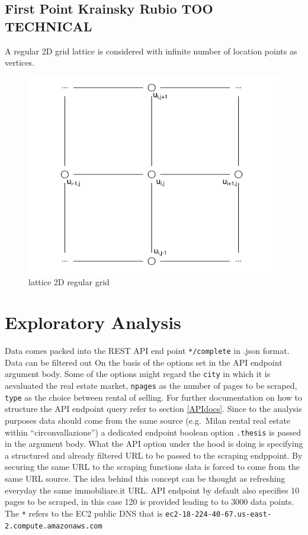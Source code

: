 \documentclass[
  12pt,
  a4paper,
  oneside]{book}
\theoremstyle{definition}
\theoremstyle{definition}
\theoremstyle{definition}
\theoremstyle{remark}
\begin{document}
\hypertarget{first-point-krainsky-rubio-too-technical}{%
\section{First Point Krainsky Rubio TOO TECHNICAL}\label{first-point-krainsky-rubio-too-technical}}

A regular 2D grid lattice is considered with infinite number of location points as vertices.

\begin{figure}
\centering
\includegraphics{images/lattice.png}
\caption{lattice 2D regular grid}
\end{figure}

\hypertarget{exploratory}{%
\chapter{Exploratory Analysis}\label{exploratory}}

Data comes packed into the REST API end point \texttt{*/complete} in .json format. Data can be filtered out On the basis of the options set in the API endpoint argument body. Some of the options might regard the \texttt{city} in which it is aevaluated the real estate market, \texttt{npages} as the number of pages to be scraped, \texttt{type} as the choice between rental of selling. For further documentation on how to structure the API endpoint query refer to section \ref{APIdocs}. Since to the analysis purposes data should come from the same source (e.g.~Milan rental real estate within ``circonvallazione'') a dedicated endpoint boolean option \texttt{.thesis} is passed in the argument body. What the API option under the hood is doing is specifying a structured and already filtered URL to be passed to the scraping endppoint. By securing the same URL to the scraping functions data is forced to come from the same URL source. The idea behind this concept can be thought as refreshing everyday the same immobiliare.it URL. API endpoint by default also specifies 10 pages to be scraped, in this case 120 is provided leading to to 3000 data points. The \texttt{*} refers to the EC2 public DNS that is \texttt{ec2-18-224-40-67.us-east-2.compute.amazonaws.com}
\end{document}
